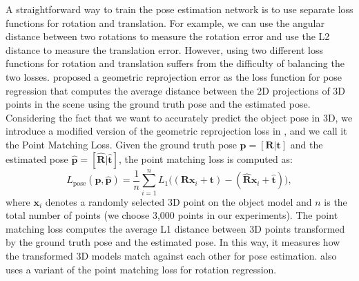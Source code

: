 \documentclass[twocolumn]{svjour3}
\newcommand{\ddd}[1]{\textcolor{red}{Dieter:#1}}
\newcommand{\yi}[1]{\textcolor{blue}{Yi:#1}}
\begin{document}
A straightforward way to train the pose estimation network is to use separate loss functions for rotation and translation. For example, we can use the angular distance between two rotations to measure the rotation error and use the L2 distance to measure the translation error. However, using two different loss functions for rotation and translation suffers from the difficulty of balancing the two losses. \citep{kendall2017geometric} proposed a geometric reprojection error as the loss function for pose regression that computes the average distance between the 2D projections of 3D points in the scene using the ground truth pose and the estimated pose.
Considering the fact that we want to accurately predict the object pose in 3D, we introduce a modified version of the geometric reprojection loss in \citep{kendall2017geometric}, and we call it the Point Matching Loss. Given the ground truth pose $\mathbf{p} = [\mathbf{R}|\mathbf{t}]$ and the estimated pose $\mathbf{\hat{p}}=[\mathbf{\hat{R}}|\mathbf{\hat{t}}]$, the point matching loss is computed as:
\begin{equation}
L_\text{pose}(\mathbf{p}, \mathbf{\hat{p}})
= \frac{1}{n} \sum_{i=1}^n L_1\big((\mathbf{R}\mathbf{x}_i+ \mathbf{t}) - (\mathbf{\hat{R}}
\mathbf{x}_i+\mathbf{\hat{t}}) \big),
\label{eq.reproj3d}
\end{equation}
where $\mathbf{x}_i$ denotes a randomly selected 3D point on the object model and $n$ is the total number of points (we choose 3,000 points in our experiments). The point matching loss computes the average L1 distance between 3D points transformed by the ground truth pose and the estimated pose. In this way, it measures how the transformed 3D models match against each other for pose estimation. \citep{xiang2017posecnn} also uses a variant of the point matching loss for rotation regression.


\end{document}

